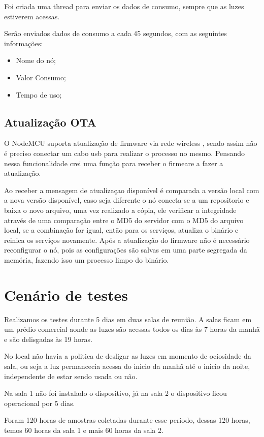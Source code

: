 \documentclass[openright]{normas-utf-tex} %
\begin{document}
Foi criada uma thread para enviar os dados de consumo, sempre que as luzes estiverem acessas. 

Serão enviados dados de consumo a cada 45 segundos, com as seguintes informações:

\begin{itemize}
    \item Nome do nó;
    \item Valor Consumo;
    \item Tempo de uso;
\end{itemize}


\subsection{Atualização OTA}

O NodeMCU suporta atualização de firmware via rede wireless  \cite{espressif}, sendo assim não é preciso conectar um cabo usb para realizar o processo no mesmo. 
Pensando nessa funcionalidade crei uma função para receber o firmeare a fazer a atualização.

Ao receber a mensagem de atualizaçao disponível é comparada a versão local com a nova versão disponível, caso seja diferente o nó conecta-se a um repositorio e baixa o novo arquivo, uma vez realizado a cópia, ele verificar a integridade através de uma comparação entre o MD5 do servidor com o MD5 do arquivo local, se a combinação for igual, então para os serviços, atualiza o binário e reinica os serviços novamente.
Após a atualização do firmware não é necessário reconfigurar o nó, pois as configurações são salvas em uma parte segregada da memória, fazendo isso um processo limpo do binário. 

\section{Cenário de testes}
Realizamos os testes durante 5 dias em duas salas de reunião. A salas ficam em um prédio comercial aonde as luzes são acessas todos os dias às 7 horas da manhã e são delisgadas às 19 horas.

No local não havia a politica de desligar as luzes em momento de ociosidade da sala, ou seja a luz permancecia acessa do inicio da manhã até o inicio da noite, independente de estar sendo usada ou não. 

Na sala 1 não foi instalado o dispositivo, já na sala 2 o dispositivo ficou operacional por 5 dias.

Foram 120 horas de amostras coletadas durante esse periodo, dessas 120 horas, temos 60 horas da sala 1 e mais 60 horas da sala 2.
\end{document}
